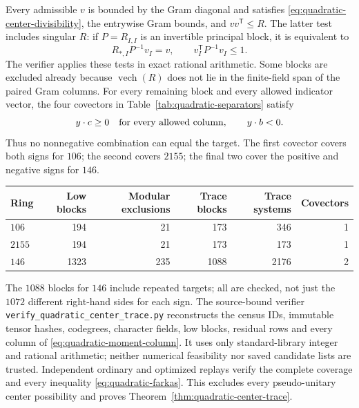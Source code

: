 Every admissible $v$ is bounded by the Gram diagonal and satisfies
\eqref{eq:quadratic-center-divisibility}, the entrywise Gram bounds,
and $vv^{\mathsf T}\leq R$. The latter test includes singular $R$:
if $P=R_{I,I}$ is an invertible principal block, it is equivalent to
\[
 R_{*,I}P^{-1}v_I=v,\qquad v_I^{\mathsf T}P^{-1}v_I\leq1.
\]
The verifier applies these tests in exact rational arithmetic.
Some blocks are excluded already because $\operatorname{vech}(R)$
does not lie in the finite-field span of the paired Gram columns.
For every remaining block and every allowed indicator vector,
the four covectors in Table~\ref{tab:quadratic-separators} satisfy
\begin{equation}\label{eq:quadratic-farkas}
               y\cdot c\geq0\quad\hbox{for every allowed column},
               \qquad y\cdot b<0.
\end{equation}
Thus no nonnegative combination can equal the target. The first
covector covers both signs for $106$; the second covers $2155$;
the final two cover the positive and negative signs for $146$.

\begin{center}
\begin{tabular}{lrrrrr}\toprule
Ring&Low blocks&Modular exclusions&Trace blocks&Trace systems&Covectors\\\midrule
$106$&194&21&173&346&1\\
$2155$&194&21&173&173&1\\
$146$&1323&235&1088&2176&2\\\bottomrule
\end{tabular}
\end{center}
The $1088$ blocks for $146$ include repeated targets; all are checked,
not just the $1072$ different right-hand sides for each sign.
The source-bound verifier \texttt{verify\_quadratic\_center\_trace.py}
reconstructs the census IDs, immutable tensor hashes, codegrees,
character fields, low blocks, residual rows and every column of
\eqref{eq:quadratic-moment-column}. It uses only standard-library
integer and rational arithmetic; neither numerical feasibility nor
saved candidate lists are trusted. Independent ordinary and optimized
replays verify the complete coverage and every inequality
\eqref{eq:quadratic-farkas}. This excludes every pseudo-unitary center
possibility and proves Theorem~\ref{thm:quadratic-center-trace}.


